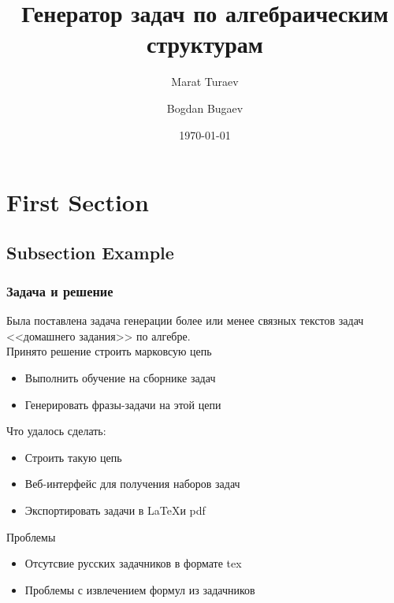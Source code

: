 \documentclass[10pt, pdf,utf8,russian]{beamer}
\title[Генератор задач]{Генератор задач по алгебраическим структурам} %
\author{
	Marat Turaev
	\and
	Bogdan Bugaev
}
\institute[SPbAU] %
{
St Petersburg Academic University \\ %
}
\date{\today} %
\begin{document}
\begin{frame}
\titlepage %
\end{frame}



\section{First Section} %

\subsection{Subsection Example} %

\begin{frame}
\frametitle{Задача и решение}
Была поставлена задача генерации более или менее связных текстов задач <<домашнего задания>> по алгебре.\\
Принято решение строить марковсую цепь
\begin{itemize}
	\item Выполнить обучение на сборнике задач
	\item Генерировать фразы-задачи на этой цепи
\end{itemize}
Что удалось сделать:
\begin{itemize}
	\item Строить такую цепь
	\item Веб-интерфейс для получения наборов задач
	\item Экспортировать задачи в \LaTeX и pdf
\end{itemize}
Проблемы
\begin{itemize}
	\item Отсутсвие русских задачников в формате tex
	\item Проблемы с извлечением формул из задачников
\end{itemize}
\end{frame}
\end{document}
